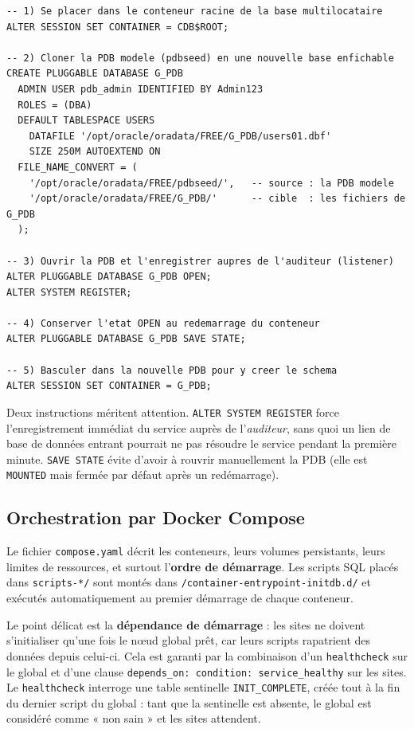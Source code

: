 \documentclass[11pt,a4paper]{article}
\begin{document}
\begin{lstlisting}[style=sql,caption={Création d'une base enfichable depuis \texttt{CDB\$ROOT} (extrait de \texttt{01\_create\_schema.sql}, nœud global).},label={lst:pdb}]
-- 1) Se placer dans le conteneur racine de la base multilocataire
ALTER SESSION SET CONTAINER = CDB$ROOT;

-- 2) Cloner la PDB modele (pdbseed) en une nouvelle base enfichable
CREATE PLUGGABLE DATABASE G_PDB
  ADMIN USER pdb_admin IDENTIFIED BY Admin123
  ROLES = (DBA)
  DEFAULT TABLESPACE USERS
    DATAFILE '/opt/oracle/oradata/FREE/G_PDB/users01.dbf'
    SIZE 250M AUTOEXTEND ON
  FILE_NAME_CONVERT = (
    '/opt/oracle/oradata/FREE/pdbseed/',   -- source : la PDB modele
    '/opt/oracle/oradata/FREE/G_PDB/'      -- cible  : les fichiers de G_PDB
  );

-- 3) Ouvrir la PDB et l'enregistrer aupres de l'auditeur (listener)
ALTER PLUGGABLE DATABASE G_PDB OPEN;
ALTER SYSTEM REGISTER;

-- 4) Conserver l'etat OPEN au redemarrage du conteneur
ALTER PLUGGABLE DATABASE G_PDB SAVE STATE;

-- 5) Basculer dans la nouvelle PDB pour y creer le schema
ALTER SESSION SET CONTAINER = G_PDB;
\end{lstlisting}

Deux instructions méritent attention. \texttt{ALTER SYSTEM REGISTER} force
l'enregistrement immédiat du service auprès de l'\emph{auditeur}, sans quoi un
lien de base de données entrant pourrait ne pas résoudre le service pendant la
première minute. \texttt{SAVE STATE} évite d'avoir à rouvrir manuellement la PDB
(elle est \texttt{MOUNTED} mais fermée par défaut après un redémarrage).

\subsection{Orchestration par Docker Compose}

Le fichier \texttt{compose.yaml} décrit les conteneurs, leurs volumes
persistants, leurs limites de ressources, et surtout l'\textbf{ordre de
démarrage}. Les scripts SQL placés dans \texttt{scripts-*/} sont montés dans
\texttt{/container-entrypoint-initdb.d/} et exécutés automatiquement au premier
démarrage de chaque conteneur.

Le point délicat est la \textbf{dépendance de démarrage} : les sites ne doivent
s'initialiser qu'une fois le nœud global prêt, car leurs scripts rapatrient des
données depuis celui-ci. Cela est garanti par la combinaison d'un
\texttt{healthcheck} sur le global et d'une clause
\texttt{depends\_on:\ condition:\ service\_healthy} sur les sites. Le
\texttt{healthcheck} interroge une table sentinelle \texttt{INIT\_COMPLETE},
créée tout à la fin du dernier script du global : tant que la sentinelle est
absente, le global est considéré comme « non sain » et les sites attendent.
\end{document}
